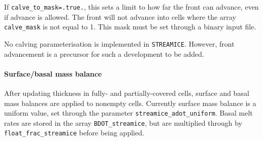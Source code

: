 If \texttt{calve\_to\_mask=.true.}, this sets a limit to how far the front can advance, even if advance is allowed. The front will not advance into cells where the array \texttt{calve\_mask} is not equal to 1. This mask must be set through a binary input file.

No calving parameterisation is implemented in \texttt{STREAMICE}. However, front advancement is a precursor for such a development to be added.

\paragraph{Surface/basal mass balance}

After updating thickness in fully- and partially-covered cells, surface and basal mass balances are applied to nonempty cells. Currently surface mass balance is a uniform value, set through the parameter \texttt{streamice\_adot\_uniform}. Basal melt rates are stored in the array \texttt{BDOT\_streamice}, but are multiplied through by \texttt{float\_frac\_streamice} before being applied.

